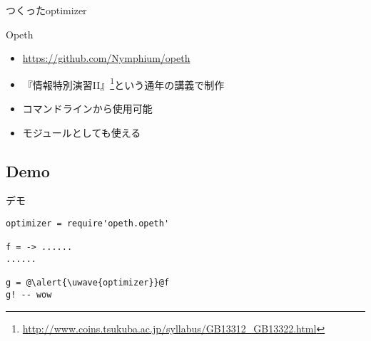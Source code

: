 \begin{frame}
	\frametitlesec
	つくったoptimizer

	\begin{center}{\theking{}Opeth\par}\end{center}
	\begin{itemize}
		\item \url{https://github.com/Nymphium/opeth}
		\item 『情報特別演習II』\footnote{\url{http://www.coins.tsukuba.ac.jp/syllabus/GB13312_GB13322.html}}という通年の講義で制作
		\item コマンドラインから使用可能
		\item モジュールとしても使える
	\end{itemize}
\end{frame}
\subsection{Demo}
\begin{frame}[fragile]
\begin{center}\Huge{}デモ\end{center}
\end{frame}
\begin{frame}[fragile]
	\frametitlesubs

	\begin{lstlisting}[language=MoonScript,numbers=none,escapechar=@]
optimizer = require'opeth.opeth'

f = -> ......
......

g = @\alert{\uwave{optimizer}}@f
g! -- wow
	\end{lstlisting}
\end{frame}
